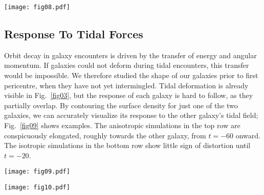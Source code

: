 \documentclass[fleqn,usenatbib]{mnras}
\begin{document}
\begin{figure*}
    \centering
    \texttt{[image: fig08.pdf]}
    \caption{Effect of starting time on first passage parameters. Colors and symbols follow the convention used in Fig.~\ref{fig06}; in addition, open circles and dotted lines show results obtained by starting at $t_{0}=-400$. For the anisotropic models, earlier starting times produce closer and faster passages; while for the isotropic models the choice of starting time has no discernible effect.}
    \label{fig08}
\end{figure*}

\subsection{Response To Tidal Forces}
\label{sec:response_to_tidal_forces}

Orbit decay in galaxy encounters is driven by the transfer of energy and angular momentum. If galaxies could not deform during tidal encounters, this transfer would be impossible. We therefore studied the shape of our galaxies prior to first pericentre, when they have not yet intermingled. Tidal deformation is already visible in Fig.~\ref{fig03}, but the response of each galaxy is hard to follow, as they partially overlap. By contouring the surface density for just one of the two galaxies, we can accurately visualize its response to the other galaxy's tidal field; Fig.~\ref{fig09} shows examples. The anisotropic simulations in the top row are conspicuously elongated, roughly towards the other galaxy, from $t=-60$ onward. The isotropic simulations in the bottom row show little sign of distortion until $t=-20$.

\begin{figure*}
   \centering
    \texttt{[image: fig09.pdf]}
    \caption{Response of one galaxy (contours) to the tidal field of its companion. This figure shows the same simulations presented in Fig.~\ref{fig03}, with anisotropic models above, and their isotropic counterparts below. Contours are spaced by factors of $\sqrt{8}$ in surface density; each frame is $32$ length units on a side. Black curves in the last two frames show trajectories of companion galaxies, which enter from the lower right.}
    \label{fig09}
\end{figure*}

\begin{figure*}
    \centering
    \texttt{[image: fig10.pdf]}
    \caption{Effect of anisotropy on shapes of interacting models. Red, blue, and grey show results for $r_\mathrm{a}=1.297$, $r_\mathrm{a}=2.0$ and $r_\mathrm{a} = \infty$, respectively. Light curves are individual realizations, heavy lines represent sample means $\overline{(c/a)}$, and vertical bars show sample standard deviations $s_{(c/a)}$.  The vertical axis uses the transformation $y = - \log_{10}(1.1 - (c/a))$ to better show small departures from sphericity. Anisotropic models become distorted earlier and more strongly than their isotropic counterparts.}
    \label{fig10}
\end{figure*}
\end{document}
